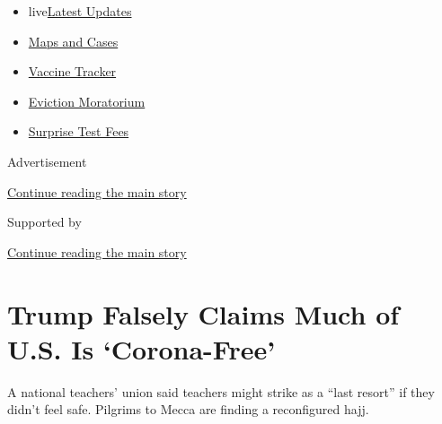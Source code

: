 \begin{itemize}
\tightlist
\item
  live\href{https://www.nytimes3xbfgragh.onion/2020/09/09/world/covid-19-coronavirus.html?name=styln-coronavirus-national\&region=TOP_BANNER\&block=storyline_menu_recirc\&action=click\&pgtype=Article\&impression_id=60672d60-f2ad-11ea-a4e6-eb9fa3a53629\&variant=undefined}{Latest
  Updates}
\item
  \href{https://www.nytimes3xbfgragh.onion/interactive/2020/us/coronavirus-us-cases.html?name=styln-coronavirus-national\&region=TOP_BANNER\&block=storyline_menu_recirc\&action=click\&pgtype=Article\&impression_id=60672d61-f2ad-11ea-a4e6-eb9fa3a53629\&variant=undefined}{Maps
  and Cases}
\item
  \href{https://www.nytimes3xbfgragh.onion/interactive/2020/science/coronavirus-vaccine-tracker.html?name=styln-coronavirus-national\&region=TOP_BANNER\&block=storyline_menu_recirc\&action=click\&pgtype=Article\&impression_id=60672d62-f2ad-11ea-a4e6-eb9fa3a53629\&variant=undefined}{Vaccine
  Tracker}
\item
  \href{https://www.nytimes3xbfgragh.onion/2020/09/02/your-money/eviction-moratorium-covid.html?name=styln-coronavirus-national\&region=TOP_BANNER\&block=storyline_menu_recirc\&action=click\&pgtype=Article\&impression_id=60672d63-f2ad-11ea-a4e6-eb9fa3a53629\&variant=undefined}{Eviction
  Moratorium}
\item
  \href{https://www.nytimes3xbfgragh.onion/2020/09/09/upshot/coronavirus-surprise-test-fees.html?name=styln-coronavirus-national\&region=TOP_BANNER\&block=storyline_menu_recirc\&action=click\&pgtype=Article\&impression_id=60672d64-f2ad-11ea-a4e6-eb9fa3a53629\&variant=undefined}{Surprise
  Test Fees}
\end{itemize}

Advertisement

\protect\hyperlink{after-top}{Continue reading the main story}

Supported by

\protect\hyperlink{after-sponsor}{Continue reading the main story}

\hypertarget{trump-falsely-claims-much-of-us-is-corona-free}{%
\section{Trump Falsely Claims Much of U.S. Is
`Corona-Free'}\label{trump-falsely-claims-much-of-us-is-corona-free}}

A national teachers' union said teachers might strike as a ``last
resort'' if they didn't feel safe. Pilgrims to Mecca are finding a
reconfigured hajj.


